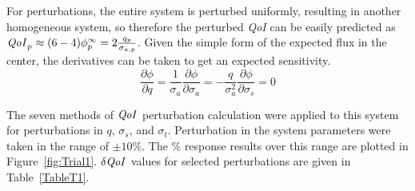 \documentclass[12pt]{report}
\newcommand{\sigt}{\sigma_t}
\newcommand{\sigs}{\sigma_s}
\newcommand{\siga}{\sigma_a}
\newcommand{\qoi}{{\it QoI}\xspace}
\begin{document}
For perturbations, the entire system is perturbed uniformly, resulting in another homogeneous system, so therefore the perturbed \qoi can be easily predicted as $\qoi_p \approx (6-4) \phi^\infty_p = 2 \frac{q_p}{\sigma_{a,p}}$. Given the simple form of the expected flux in the center, the derivatives can be taken to get an expected sensitivity.
\begin{subequations}
\begin{equation}
 \frac{\partial \phi}{\partial q} = \frac{1}{\siga}   
\end{equation}
\begin{equation}
 \frac{\partial \phi}{\partial \siga} = - \frac{q}{\siga^2}   
\end{equation}
\begin{equation}
 \frac{\partial \phi}{\partial \sigs} = 0  
\end{equation}
\end{subequations}

The seven methods of $\qoi$ perturbation calculation were applied to this system for perturbations in $q$, $\sigs$, and $\sigt$. Perturbation in the system parameters were taken in the range of $\pm 10 \%$. The \% response results over this range are plotted in Figure~\ref{fig:Trial1}. $\delta \qoi$ values for selected perturbations are given in Table~\ref{TableT1}.
\end{document}
